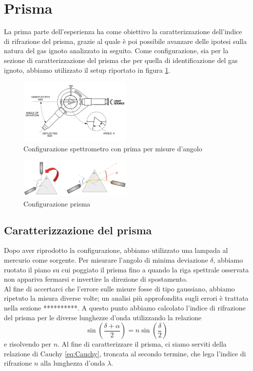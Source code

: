 \documentclass[letterpaper,12pt]{article}
\begin{document}
\section{Prisma}
La prima parte dell'esperienza ha come obiettivo la caratterizzazione dell'indice di rifrazione del prisma, 
grazie al quale è poi possibile avanzare delle ipotesi sulla natura del gas ignoto analizzato in seguito. Come configurazione, sia per
la sezione di caratterizzazione del prisma che per quella di identificazione del gas ignoto, abbiamo utilizzato il setup
riportato in figura \ref{fig:SetupPrisma}.
\begin{figure}[h!]
	\centering
	\includegraphics[width = 0.5\textwidth]{SetupIniziale.jpeg}
	\caption{Configurazione spettrometro con prima per misure d'angolo}
	\label{fig:SetupPrisma}
\end{figure}

\begin{figure}[h!]
	\centering
	\includegraphics[width = 0.5\textwidth]{Prisma.jpeg}
	\caption{Configurazione prisma}
	\label{fig:Prisma}
\end{figure}


\subsection{Caratterizzazione del prisma}
Dopo aver riprodotto la configurazione, abbiamo utilizzato una lampada al mercurio come sorgente. 
Per misurare l'angolo di minima deviazione $\delta$, abbiamo ruotato il piano su cui poggiato il prisma fino a quando
la riga spettrale osservata non appariva fermarsi e invertire la direzione di spostamento. \\
Al fine di accertarci che l'errore sulle misure fosse di tipo gaussiano, abbiamo ripetuto la misura diverse volte; un analisi più
approfondita sugli errori è trattata nella sezione **********.
A questo punto abbiamo calcolato l'indice di rifrazione del prisma per le diverse lunghezze d'onda utilizzando la relazione 
$$\sin(\frac{\delta + \alpha}{2}) = n \sin(\frac{\delta}{2})$$
e risolvendo per $n$.
Al fine di caratterizzare il prisma, ci siamo serviti della relazione di Cauchy \eqref{eq:Cauchy}, troncata al secondo termine,
che lega l'indice di rifrazione $n$ alla lunghezza d'onda $\lambda$.
\end{document}
